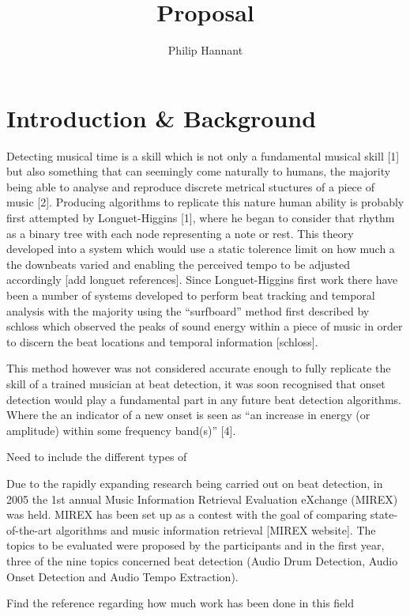 \documentclass[a4paper, 11pt]{article}
\title{Proposal} \author{Philip Hannant}
\begin{document}
 \maketitle{} \section{Introduction \& Background}

Detecting musical time is a skill which is not only a fundamental musical skill [1] but also something that can seemingly come naturally to humans, the majority being able to analyse and reproduce discrete metrical stuctures of a piece of music [2]. Producing algorithms to replicate this nature human ability is probably first attempted by Longuet-Higgins [1], where he began to consider that rhythm as a binary tree with each node representing a note or rest. This theory developed into a system which would use a static tolerence limit on how much a the downbeats varied and enabling the perceived tempo to be adjusted accordingly [add longuet references]. Since Longuet-Higgins first work there have been a number of systems developed to perform beat tracking and temporal analysis with the majority using the ``surfboard'' method first described by schloss which observed the peaks of sound energy within a piece of music in order to discern the beat locations and temporal information [schloss]. 

This method however was not considered accurate enough to fully replicate the skill of a trained musician at beat detection, it was soon recognised that onset detection would play a fundamental part in any future beat detection algorithms. Where the an indicator of a new onset is seen as ``an increase in energy (or amplitude) within some frequency band(s)'' [4].

Need to include the different types of 

Due to the rapidly expanding research being carried out on beat detection, in 2005 the 1st annual Music Information Retrieval Evaluation eXchange (MIREX) was held. MIREX has been set up as a contest with the goal of comparing state-of-the-art algorithms and music information retrieval [MIREX website]. The topics to be evaluated were proposed by the participants and in the first year, three of the nine topics concerned beat detection (Audio Drum Detection, Audio Onset Detection and Audio Tempo Extraction).  

Find the reference regarding how much work has been done in this field
\end{document}
